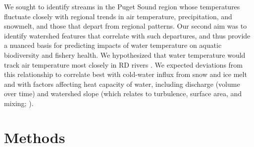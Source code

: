 \documentclass[notitlepage]{article}
\begin{document}

We sought to identify streams in the Puget Sound region whose temperatures fluctuate closely with regional trends in air temperature, precipitation, and snowmelt, and those that depart from regional patterns. Our second aim was to identify watershed features that correlate with such departures, and thus provide a nuanced basis for predicting impacts of water temperature on aquatic biodiversity and fishery health. We hypothesized that water temperature would track air temperature most closely in RD rivers \citep{ward1985thermal,garner2014river}. We expected deviations from this relationship to correlate best with cold-water influx from snow and ice melt \citep{lisi2015watershed} and with factors affecting heat capacity of water, including discharge (volume over time) and watershed slope (which relates to turbulence, surface area, and mixing; \citealt{van2013global}).


\section*{Methods}



\end{document}

